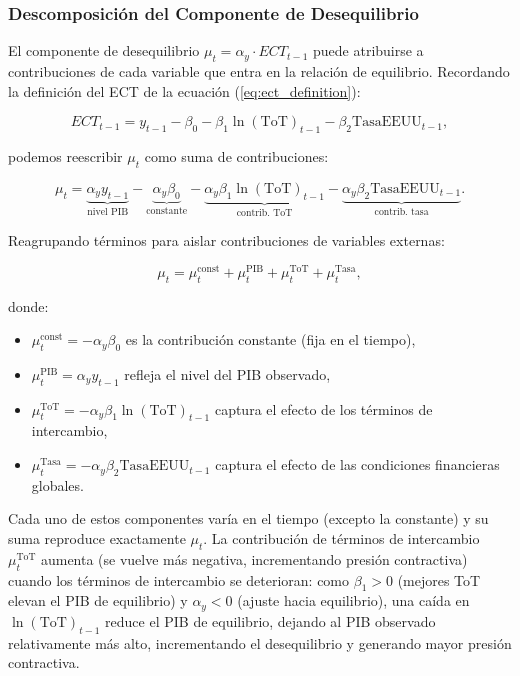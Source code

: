 \documentclass[3p,11pt,draft,natbib=false]{elsarticle}
\begin{document}
\subsubsection{Descomposición del Componente de Desequilibrio}

El componente de desequilibrio $\mu_t = \alpha_y \cdot ECT_{t-1}$ puede atribuirse a contribuciones de cada variable que entra en la relación de equilibrio. Recordando la definición del ECT de la ecuación (\ref{eq:ect_definition}):

\begin{equation}
ECT_{t-1} = y_{t-1} - \beta_0 - \beta_1 \ln(\text{ToT})_{t-1} - \beta_2 \text{TasaEEUU}_{t-1},
\end{equation}

podemos reescribir $\mu_t$ como suma de contribuciones:

\begin{equation}
\mu_t = \underbrace{\alpha_y y_{t-1}}_{\text{nivel PIB}} - \underbrace{\alpha_y \beta_0}_{\text{constante}} - \underbrace{\alpha_y \beta_1 \ln(\text{ToT})_{t-1}}_{\text{contrib. ToT}} - \underbrace{\alpha_y \beta_2 \text{TasaEEUU}_{t-1}}_{\text{contrib. tasa}}.
\label{eq:mu_attribution}
\end{equation}

Reagrupando términos para aislar contribuciones de variables externas:

\begin{equation}
\mu_t = \mu_t^{\text{const}} + \mu_t^{\text{PIB}} + \mu_t^{\text{ToT}} + \mu_t^{\text{Tasa}},
\label{eq:mu_components}
\end{equation}

donde:
\begin{itemize}
    \item $\mu_t^{\text{const}} = -\alpha_y \beta_0$ es la contribución constante (fija en el tiempo),
    \item $\mu_t^{\text{PIB}} = \alpha_y y_{t-1}$ refleja el nivel del PIB observado,
    \item $\mu_t^{\text{ToT}} = -\alpha_y \beta_1 \ln(\text{ToT})_{t-1}$ captura el efecto de los términos de intercambio,
    \item $\mu_t^{\text{Tasa}} = -\alpha_y \beta_2 \text{TasaEEUU}_{t-1}$ captura el efecto de las condiciones financieras globales.
\end{itemize}

Cada uno de estos componentes varía en el tiempo (excepto la constante) y su suma reproduce exactamente $\mu_t$. La contribución de términos de intercambio $\mu_t^{\text{ToT}}$ aumenta (se vuelve más negativa, incrementando presión contractiva) cuando los términos de intercambio se deterioran: como $\beta_1 > 0$ (mejores ToT elevan el PIB de equilibrio) y $\alpha_y < 0$ (ajuste hacia equilibrio), una caída en $\ln(\text{ToT})_{t-1}$ reduce el PIB de equilibrio, dejando al PIB observado relativamente más alto, incrementando el desequilibrio y generando mayor presión contractiva.
\end{document}
